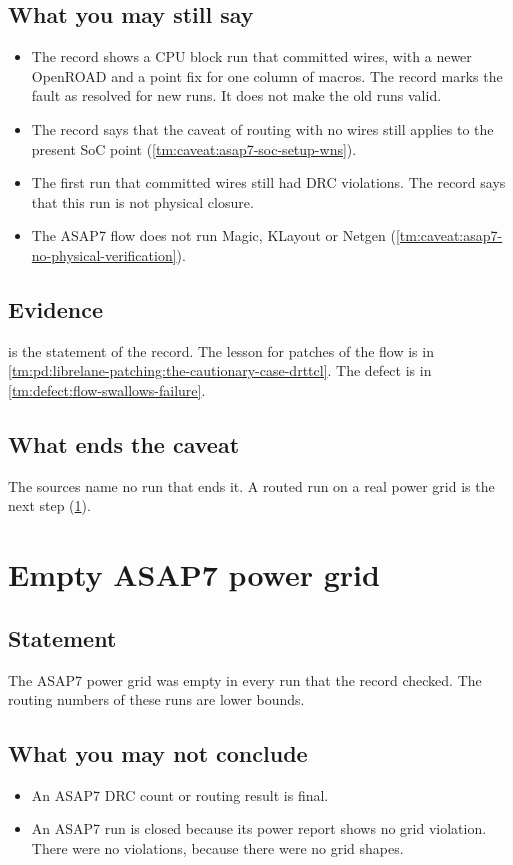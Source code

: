 \subsection*{What you may still say}
\begin{itemize}
  \item The record shows a CPU block run that committed wires, with a newer OpenROAD and a point fix for one column of macros. The record marks the fault as resolved for new runs. It does not make the old runs valid.
  \item The record says that the caveat of routing with no wires still applies to the present SoC point (\cref{tm:caveat:asap7-soc-setup-wns}).
  \item The first run that committed wires still had DRC violations. The record says that this run is not physical closure.
  \item The ASAP7 flow does not run Magic, KLayout or Netgen (\cref{tm:caveat:asap7-no-physical-verification}).
\end{itemize}

\subsection*{Evidence}
 is the statement of the record. The lesson for patches of the flow is in \cref{tm:pd:librelane-patching:the-cautionary-case-drttcl}. The defect is in \cref{tm:defect:flow-swallows-failure}.

\subsection*{What ends the caveat}
The sources name no run that ends it. A routed run on a real power grid is the next step (\cref{tm:caveat:asap7-empty-power-grid}).

\section{Empty ASAP7 power grid}\label{tm:caveat:asap7-empty-power-grid}
\subsection*{Statement}
The ASAP7 power grid was empty in every run that the record checked. The routing numbers of these runs are lower bounds.

\subsection*{What you may not conclude}
\begin{itemize}
  \item An ASAP7 DRC count or routing result is final.
  \item An ASAP7 run is closed because its power report shows no grid violation. There were no violations, because there were no grid shapes.
\end{itemize}


